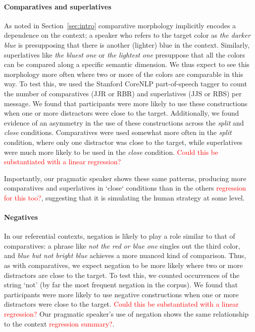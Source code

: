 \documentclass[11pt,letterpaper]{article}
\newcommand{\word}{\textit}
\renewcommand{\|}{\mid}
\newcommand{\secref}[1]{Section~\ref{#1}}
\newcommand{\todocheck}[1]{\textcolor{red}{#1}}
\newcommand{\cond}{\emph}
\begin{document}
\paragraph{Comparatives and superlatives}
As noted in \secref{sec:intro} comparative morphology implicitly
encodes a dependence on the context; a speaker who refers to the
target color as \word{the darker blue} is presupposing that there is
another (lighter) blue in the context. Similarly, superlatives like
\word{the bluest one} or \word{the lightest one} presuppose that all
the colors can be compared along a specific semantic dimension. We
thus expect to see this morphology more often where two or more of the
colors are comparable in this way. To test this, we used the Stanford
CoreNLP part-of-speech tagger \cite{Toutanova2003} to count the number
of comparatives (JJR or RBR) and superlatives (JJS or RBS) per
message. We found that participants were more likely to use these
constructions when one or more distractors were close to the target.
Additionally, we found evidence of an asymmetry in the use of these
constructions across the \cond{split} and \cond{close} conditions.
Comparatives were used somewhat more often in the \cond{split} condition,
where only one distractor was close to the target, while superlatives
were much more likely to be used in the \cond{close} condition.
\todocheck{Could this be substantiated with a linear regression?}

Importantly, our pragmatic speaker shows these same patterns,
producing more comparatives and superlatives in `close` conditions
than in the others \todocheck{regression for this too?}, suggesting
that it is simulating the human strategy at some level.

\paragraph{Negatives}
In our referential contexts, negation is likely to play a role similar
to that of comparatives: a phrase like \word{not the red or blue one}
singles out the third color, and \word{blue but not bright blue}
achieves a more nuanced kind of comparison. Thus, as with
comparatives, we expect negation to be more likely where two or more
distractors are close to the target. To test this, we counted
occurrences of the string `not' (by far the most frequent negation in
the corpus). We found that participants were more likely to use
negative constructions when one or more distractors were close to the
target. \todocheck{Could this be substantiated with a linear
  regression?} Our pragmatic speaker's use of negation shows the 
same relationship to the context \todocheck{regression summary?}.
\end{document}
